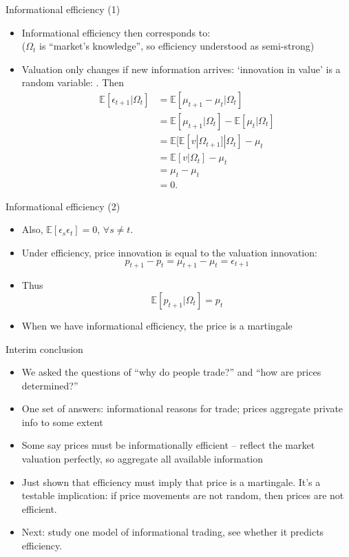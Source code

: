 \documentclass[english,10pt
,aspectratio=169
]{beamer}
\begin{document}
\begin{frame}{Informational efficiency (1)}
\begin{itemize}
	\item Informational efficiency then corresponds to: 
	\\
	($\Omega_t$ is ``market's knowledge'', so efficiency understood as semi-strong)
	\item Valuation only changes if new information arrives: `innovation in value' is a random variable: . Then
	\begin{align*}
		\mathbb{E}[\epsilon_{t+1}|\Omega_t] 
		& = \mathbb{E}[\mu_{t+1} - \mu_t|\Omega_t]\\
		& = \mathbb{E}[\mu_{t+1}|\Omega_t] - \mathbb{E}[\mu_t|\Omega_t]\\  
		& = \mathbb{E}[ \mathbb{E}[v|\Omega_{t+1}]|\Omega_t] - \mu_t\\  
		& = \mathbb{E}[v|\Omega_t] - \mu_t\\  
		& = \mu_t- \mu_t\\  
		& = 0.
	\end{align*}
\end{itemize}
\end{frame}


\begin{frame}{Informational efficiency (2)}
\begin{itemize}
	\item Also, $\mathbb{E}[\epsilon_{s}\epsilon_t]=0$, $\forall s \ne t$.
	\item Under efficiency, price innovation is equal to the valuation innovation:
	\[
	p_{t+1} - p_t = \mu_{t+1} - \mu_t = \epsilon_{t+1}
	\]
	\item Thus
	\[
	\mathbb{E}[p_{t+1}|\Omega_{t}] = p_t
	\]
	\item When we have informational efficiency, the price is a \alert{martingale}
\end{itemize}
\end{frame}


\begin{frame}{Interim conclusion}
\begin{itemize}
	\item We asked the questions of ``why do people trade?'' and ``how are prices determined?''
	\item One set of answers: informational reasons for trade; prices aggregate private info to some extent
	\item Some say prices must be informationally efficient -- reflect the market valuation perfectly, so aggregate all available information
	\item Just shown that efficiency must imply that price is a martingale. It's a testable implication: if price movements are not random, then prices are not efficient.
	\item Next: study one model of informational trading, see whether it predicts efficiency.
\end{itemize}
\end{frame}
\end{document}
